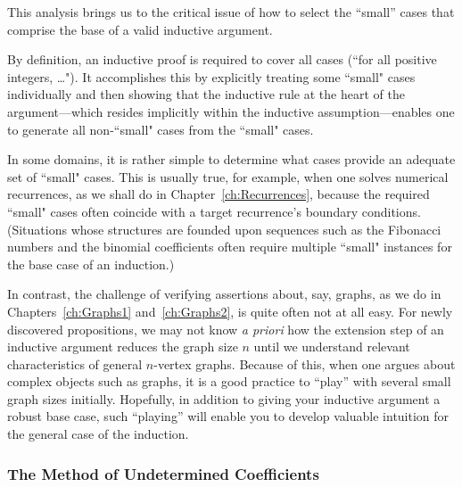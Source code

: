 \smallskip

This analysis brings us to the critical issue of how to select the ``small'' cases that comprise the base of a valid inductive argument.

\medskip

By definition, an inductive proof is required to cover all cases (``for all positive integers, \ldots").  It accomplishes this by explicitly treating some ``small" cases individually and then showing that the inductive rule at the heart of the argument---which resides implicitly within the inductive assumption---enables one to generate all non-``small" cases from the ``small" cases.

In some domains, it is rather simple to determine what cases provide an adequate set of ``small" cases.  This is usually true, for example, when one solves numerical recurrences, as we shall do in Chapter~\ref{ch:Recurrences}, because the required ``small" cases often coincide with a target recurrence's boundary conditions.  (Situations whose structures are founded upon sequences such as the Fibonacci numbers and the binomial coefficients often require multiple ``small" instances for the base case of an induction.)

 

\smallskip

In contrast, the challenge of verifying assertions about, say, graphs, as we do in Chapters~\ref{ch:Graphs1} and~\ref{ch:Graphs2}, is quite often not at all easy.  For newly discovered propositions, we may not know {\em a priori} how the extension step of an inductive argument reduces the graph size $n$ until we understand relevant characteristics of general $n$-vertex graphs.  Because of this, when one argues about complex objects such as graphs, it is a good practice to ``play'' with several small graph sizes initially.  Hopefully, in addition to giving your inductive argument a robust base case, such ``playing'' will enable you to develop valuable intuition for the general case of the induction.


\subsubsection{The Method of Undetermined Coefficients}
\label{sec:undetermined-coefficients1}


